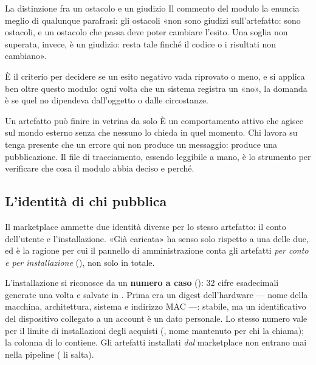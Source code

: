 \begin{perche}{La distinzione fra un ostacolo e un giudizio}
Il commento del modulo la enuncia meglio di qualunque parafrasi: gli
ostacoli «non sono giudizi sull'artefatto: sono ostacoli, e un ostacolo che
passa deve poter cambiare l'esito. Una soglia non superata, invece, è un
giudizio: resta tale finché il codice o i risultati non cambiano».

È il criterio per decidere se un esito negativo vada riprovato o meno, e si
applica ben oltre questo modulo: ogni volta che un sistema registra un
«no», la domanda è se quel no dipendeva dall'oggetto o dalle circostanze.
\end{perche}

\begin{attenzione}{Un artefatto può finire in vetrina da solo}
È un comportamento attivo che agisce sul mondo esterno senza che nessuno lo
chieda in quel momento. Chi lavora su  tenga presente
che un errore qui non produce un messaggio: produce una pubblicazione. Il
file di tracciamento, essendo leggibile a mano, è lo strumento per
verificare che cosa il modulo abbia deciso e perché.
\end{attenzione}

\subsection{L'identità di chi pubblica}

Il marketplace ammette due identità diverse per lo stesso artefatto: il conto
dell'utente e l'installazione. «Già caricata» ha senso solo rispetto a una
delle due, ed è la ragione per cui il pannello di amministrazione conta gli
artefatti \emph{per conto e per installazione}
(), non solo in totale.

L'installazione si riconosce da un \textbf{numero a caso}
(): \num{32} cifre esadecimali generate una
volta e salvate in . Prima era un digest
dell'hardware --- nome della macchina, architettura, sistema e indirizzo MAC
---: stabile, ma un identificativo del dispositivo collegato a un account è
un dato personale. Lo stesso numero vale per il limite di installazioni degli
acquisti (, nome mantenuto per
chi la chiama); la colonna  di  lo
contiene. Gli artefatti installati \emph{dal} marketplace non entrano mai
nella pipeline ( li salta).
